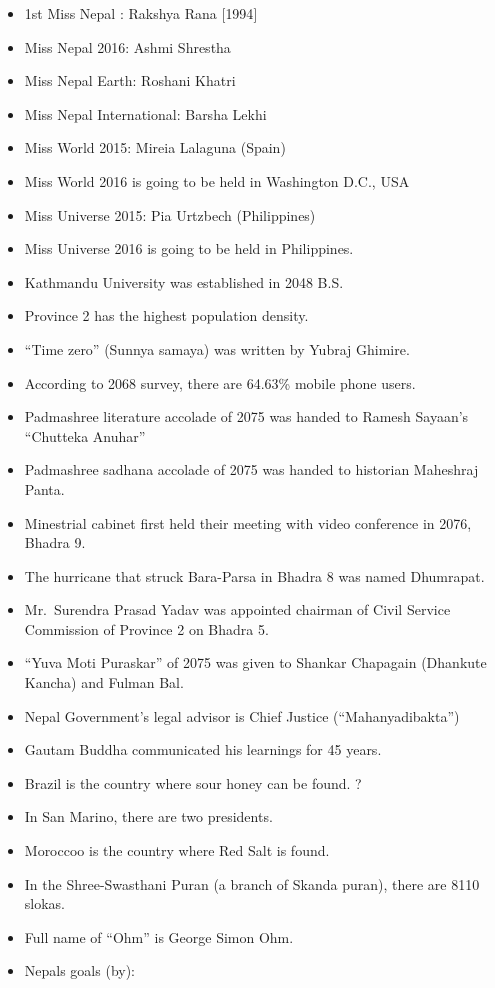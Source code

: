 \documentclass[
  openany]{book}
\begin{document}
\begin{itemize}
\item
  1st Miss Nepal : Rakshya Rana {[}1994{]}
\item
  Miss Nepal 2016: Ashmi Shrestha\\
\item
  Miss Nepal Earth: Roshani Khatri
\item
  Miss Nepal International: Barsha Lekhi
\item
  Miss World 2015: Mireia Lalaguna (Spain)
\item
  Miss World 2016 is going to be held in Washington D.C., USA
\item
  Miss Universe 2015: Pia Urtzbech (Philippines)
\item
  Miss Universe 2016 is going to be held in Philippines.
\item
  Kathmandu University was established in 2048 B.S.
\item
  Province 2 has the highest population density.
\item
  ``Time zero'' (Sunnya samaya) was written by Yubraj Ghimire.
\item
  According to 2068 survey, there are 64.63\% mobile phone users.
\item
  Padmashree literature accolade of 2075 was handed to Ramesh Sayaan's ``Chutteka Anuhar''
\item
  Padmashree sadhana accolade of 2075 was handed to historian Maheshraj Panta.
\item
  Minestrial cabinet first held their meeting with video conference in 2076, Bhadra 9.
\item
  The hurricane that struck Bara-Parsa in Bhadra 8 was named Dhumrapat.
\item
  Mr.~Surendra Prasad Yadav was appointed chairman of Civil Service Commission of Province 2 on Bhadra 5.
\item
  ``Yuva Moti Puraskar'' of 2075 was given to Shankar Chapagain (Dhankute Kancha) and Fulman Bal.
\item
  Nepal Government's legal advisor is Chief Justice (``Mahanyadibakta'')
\item
  Gautam Buddha communicated his learnings for 45 years.
\item
  Brazil is the country where sour honey can be found. ?
\item
  In San Marino, there are two presidents.
\item
  Moroccoo is the country where Red Salt is found.
\item
  In the Shree-Swasthani Puran (a branch of Skanda puran), there are 8110 slokas.
\item
  Full name of ``Ohm'' is George Simon Ohm.
\item
  Nepals goals (by):


\end{itemize}
\end{document}

